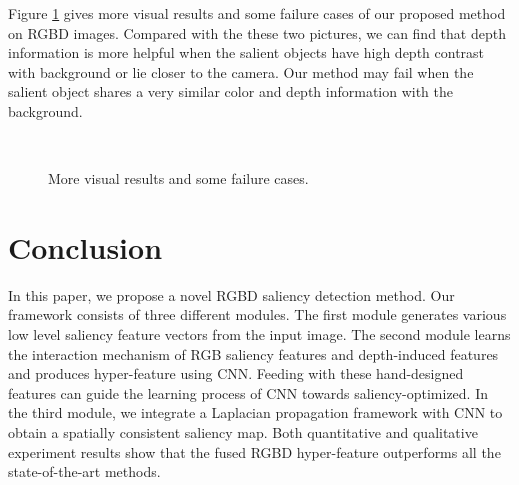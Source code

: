 \documentclass[journal]{IEEEtran}
\def\hspacefigure{\hspace{-0.8mm}}
\def\widtheighttwo{0.23\linewidth}
\begin{document}
 Figure \ref{fig:saliencyRGBvsRGBD} gives more visual results and some failure cases of our proposed method on RGBD images.
Compared with the these two pictures, we can find that depth information is more helpful when the salient objects have high depth contrast with background or lie closer to the camera.
Our method may fail when the salient object shares a very similar color and depth information with the background.
\begin{figure}
\centering
\captionsetup[subfigure]{labelformat=empty}
 \hspacefigure
{} \hspacefigure
{} \hspacefigure
{}\hspacefigure\\
\vspace{-1.5mm}
  \hspace{-1mm}\hspacefigure
{}\hspacefigure
{}\hspacefigure
   \caption{More visual results and some failure cases.}
    \label{fig:saliencyRGBvsRGBD} \end{figure}
\section{Conclusion}
In this paper, we propose a novel RGBD saliency detection method. Our framework consists of three different modules. The first module generates various low level saliency feature vectors
from the input image. The second module learns the interaction mechanism of RGB saliency features and depth-induced features and produces hyper-feature using CNN. Feeding with these hand-designed features can guide the learning process of CNN towards saliency-optimized. In the third module, we integrate a Laplacian propagation framework with CNN to obtain a spatially consistent saliency map. Both quantitative and qualitative experiment results show that the fused RGBD hyper-feature outperforms all the state-of-the-art methods.
\end{document}
